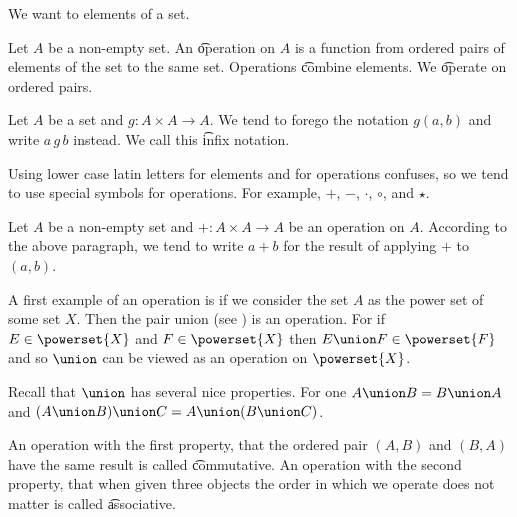 

We want to  elements of a set.


Let $A$ be a non-empty set.
An \t{operation} on $A$ is a function from ordered pairs of elements of the set to the same set.
Operations \t{combine} elements.
We \t{operate} on ordered pairs.


Let $A$ be a set and $g: A \times A \to A$.
We tend to forego the notation $g(a, b)$ and write $a\,g\,b$ instead.
We call this \t{infix notation}.

Using lower case latin letters for elements and for operations confuses, so we tend to use special symbols for operations.
For example, $+$, $-$, $\cdot$, $\circ$, and $\star$.

Let $A$ be a non-empty set and $+: A \times A \to A$ be an operation on $A$.
According to the above paragraph, we tend to write $a+b$ for the result of applying $+$ to $(a,b)$.


A first example of an operation is if we consider the set $A$ as the power set of some set $X$.
Then the pair union (see ) is an operation.
For if $E \in \powerset{X}$ and $F \in \powerset{X}$ then $E \union F \in \powerset{F}$ and so $\union$ can be viewed as an operation on $\powerset{X}$.


Recall that $\union$ has several nice properties.
For one $A \union B = B \union A$ and $(A \union B) \union C = A \union (B \union C)$.

An operation with the first property, that the ordered pair $(A, B)$ and $(B, A)$ have the same result is called \t{commutative}.
An operation with the second property, that when given three objects the order in which we operate does not matter is called \t{associative}.
